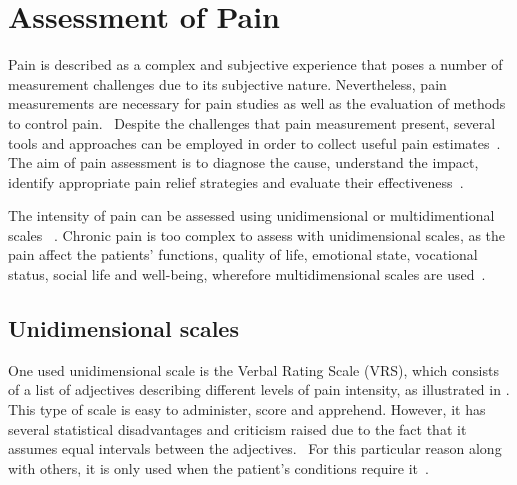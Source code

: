 \section{Assessment of Pain}
Pain is described as a complex and subjective experience that poses a number of measurement challenges due to its subjective nature. Nevertheless, pain measurements are necessary for pain studies as well as the evaluation of methods to control pain.~\cite{Jensen2001} %
Despite the challenges that pain measurement present, several tools and approaches can be employed in order to collect useful pain estimates~\cite{Younger2010}. The aim of pain assessment is to diagnose the cause, understand the impact, identify appropriate pain relief strategies and evaluate their effectiveness~\cite{Briggs2010}.


The intensity of pain can be assessed using unidimensional or multidimentional scales ~\cite{Jensen2001}.
Chronic pain is too complex to assess with unidimensional scales, as the pain affect the patients' functions, quality of life, emotional state, vocational status, social life and well-being, wherefore multidimensional scales are used~\cite{Ebert2010}. 


\subsection{Unidimensional scales}
One used unidimensional scale is the Verbal Rating Scale (VRS), which consists of a list of adjectives describing different levels of pain intensity, as illustrated in . This type of scale is easy to administer, score and apprehend. However, it has several statistical disadvantages and criticism raised due to the fact that it assumes equal intervals between the adjectives.~\cite{Jensen2001} For this particular reason along with others, it is only used when the patient's conditions require it~\cite{Jensen1986}. 

